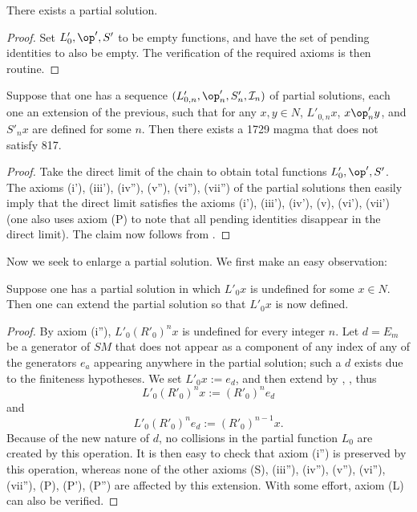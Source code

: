 \begin{lemma}\label{partial-exist}\leanok  There exists a partial solution.
\end{lemma}

\begin{proof}\leanok Set $L'_0, \op', S'$ to be empty functions, and have the set of pending identities to also be empty.  The verification of the required axioms is then routine.
\end{proof}

\begin{lemma}\label{chain}\leanok  Suppose that one has a sequence
$(L'_{0,n}, \op'_{n}, S'_{n}, {\mathcal I}_n)$ of partial solutions, each one an extension of the previous, such that for any $x, y \in N$, $L'_{0,n} x$, $x \op'_{n} y$, and $S'_n x$ are defined for some $n$.  Then there exists a 1729 magma that does not satisfy 817.
\end{lemma}

\begin{proof}\leanok  Take the direct limit of the chain to obtain total functions $L'_0, \op', S'$.  The axioms (i'), (iii'), (iv''), (v''), (vi''), (vii'') of the partial solutions then easily imply that the direct limit satisfies the axioms (i'), (iii'), (iv'), (v), (vi'), (vii') (one also uses axiom (P) to note that all pending identities disappear in the direct limit). The claim now follows from .
\end{proof}


Now we seek to enlarge a partial solution. We first make an easy observation:

\begin{proposition}[Enlarging $L'_0$]\label{enlarge-l0}\leanok  Suppose one has a partial solution in which $L'_0 x$ is undefined for some $x \in N$.  Then one can extend the partial solution so that $L'_0 x$ is now defined.
\end{proposition}

\begin{proof} \leanok By axiom (i''), $L'_0 (R'_0)^n x$ is undefined for every integer $n$.  Let $d = E_m$ be a generator of $SM$ that does not appear as a component of any index of any of the generators $e_a$ appearing anywhere in the partial solution; such a $d$ exists due to the finiteness hypotheses.  We set $L'_0 x := e_d$, and then extend by , , thus
$$L'_0 (R'_0)^n x := (R'_0)^n e_d$$
and
$$L'_0 (R'_0)^n e_d := (R'_0)^{n-1} x.$$
Because of the new nature of $d$, no collisions in the partial function $L_0$ are created by this operation.  It is then easy to check that axiom (i'') is preserved by this operation, whereas none of the other axioms (S), (iii''), (iv''), (v''), (vi''), (vii''), (P), (P'), (P'') are affected by this extension.  With some effort, axiom (L) can also be verified.
\end{proof}


